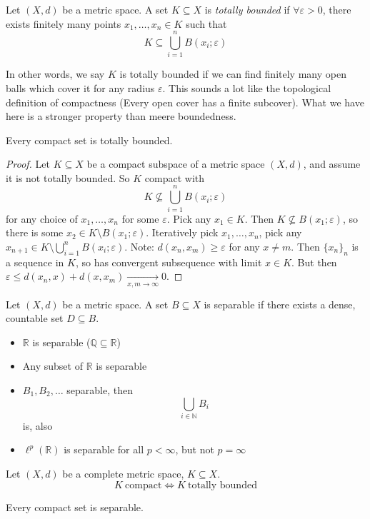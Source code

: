 \begin{defn}
    Let $(X,d)$ be a metric space. A set $K \subseteq X$ is 
    \emph{totally bounded} if $\forall \varepsilon > 0$, 
    there exists finitely many points $x_1,\ldots,x_n \in K$ 
    such that 
    \[
        K \subseteq \bigcup_{i=1}^n B(x_i;\varepsilon)
    \]
\end{defn}
In other words, we say $K$ is totally bounded if we can find 
finitely many open balls which cover it for any 
radius $\varepsilon$. This sounds a lot like the topological 
definition of compactness (Every open cover has a finite subcover).
What we have here is a stronger property than meere boundedness. 
\begin{lem}
    Every compact set is totally bounded.
\end{lem}
\begin{proof}
    Let $K \subseteq X$ be a compact subspace of a metric 
    space $(X,d)$, and assume it is not totally bounded.   
    So $K$ compact with 
    \[
        K \not\subseteq \bigcup_{i=1}^n B(x_i;\varepsilon)  
    \]
    for any choice of $x_1, \ldots,x_n$ for some $\varepsilon$.
    Pick any $x_1 \in K$. Then $K \not\subseteq B(x_1;\varepsilon)$,
    so there is some $x_2 \in K \setminus B(x_1;\varepsilon)$.
    Iteratively pick $x_1,\ldots,x_n$, pick any 
    $x_{n+1} \in K \setminus \bigcup_{i=1}^n B(x_i;\varepsilon)$. 
    Note: $d(x_n, x_m) \geq \varepsilon$ for any $x \neq m$. 
    Then $\{x_n\}_n$ is a sequence in $K$, so has convergent 
    subsequence with limit $x \in K$. But then 
    $\varepsilon \leq d(x_n,x) + d(x,x_m) 
    \underset{x,m \to \infty}{\to} 0$.
\end{proof}

\begin{defn}
    Let $(X,d)$ be a metric space. A set $B \subseteq X$ is 
    separable if there exists a dense, countable set 
    $D \subseteq B$.
\end{defn}
\begin{ex}
    \begin{itemize}
        \item $\mathbb R$ is separable ($\mathbb Q \subseteq 
            \mathbb R$)
        \item Any subset of $\mathbb R$ is separable 
        \item $B_1, B_2, \ldots$ separable, then 
            \[
                \bigcup_{i\in\mathbb N} B_i
            \]
            is, also 
        \item $\ell^p(\mathbb R)$ is separable for all 
            $p < \infty$, but not $p = \infty$
    \end{itemize}
\end{ex}
\begin{thm}
    Let $(X,d)$ be a complete metric space, $K \subseteq X$. 
    \[
        K \ \text{compact} \Leftrightarrow K \ \text{totally bounded}
    \]
\end{thm}
\begin{thm}
    Every compact set is separable.
\end{thm}
\newpage 
